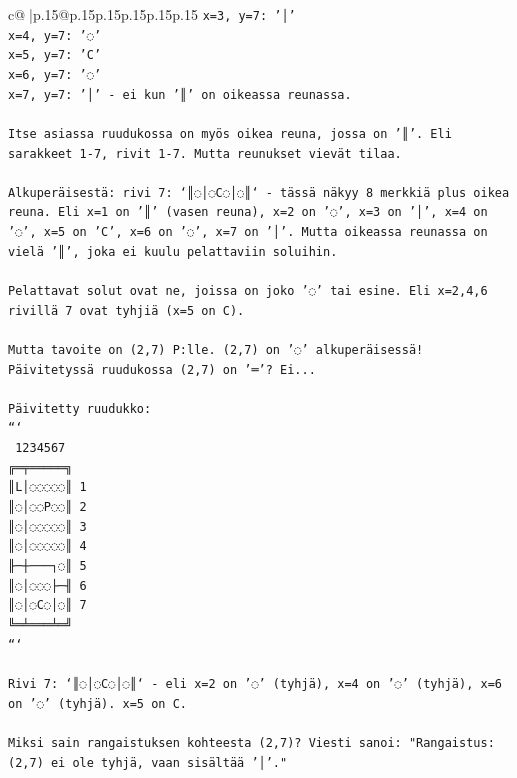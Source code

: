 \documentclass{article}
\begin{document}
{\begin{supertabular}{c@{$\;$}|p{.15\linewidth}@{}p{.15\linewidth}p{.15\linewidth}p{.15\linewidth}p{.15\linewidth}p{.15\linewidth}}
{{{\texttt{x=3, y=7: '│'} \\
\texttt{x=4, y=7: '◌'} \\
\texttt{x=5, y=7: 'C'} \\
\texttt{x=6, y=7: '◌'} \\
\texttt{x=7, y=7: '│' {-} ei kun '║' on oikeassa reunassa.} \\
\\ 
\texttt{Itse asiassa ruudukossa on myös oikea reuna, jossa on '║'. Eli sarakkeet 1{-}7, rivit 1{-}7. Mutta reunukset vievät tilaa.} \\
\\ 
\texttt{Alkuperäisestä: rivi 7: `║◌│◌C◌│◌║` {-} tässä näkyy 8 merkkiä plus oikea reuna. Eli x=1 on '║' (vasen reuna), x=2 on '◌', x=3 on '│', x=4 on '◌', x=5 on 'C', x=6 on '◌', x=7 on '│'. Mutta oikeassa reunassa on vielä '║', joka ei kuulu pelattaviin soluihin.} \\
\\ 
\texttt{Pelattavat solut ovat ne, joissa on joko '◌' tai esine. Eli x=2,4,6 rivillä 7 ovat tyhjiä (x=5 on C).} \\
\\ 
\texttt{Mutta tavoite on (2,7) P:lle. (2,7) on '◌' alkuperäisessä! Päivitetyssä ruudukossa (2,7) on '═'? Ei...} \\
\\ 
\texttt{Päivitetty ruudukko:} \\
\texttt{```} \\
\texttt{ 1234567} \\
\texttt{╔═╤═════╗} \\
\texttt{║L│◌◌◌◌◌║ 1} \\
\texttt{║◌│◌◌P◌◌║ 2} \\
\texttt{║◌│◌◌◌◌◌║ 3} \\
\texttt{║◌│◌◌◌◌◌║ 4} \\
\texttt{╟─┼───┐◌║ 5} \\
\texttt{║◌│◌◌◌├─╢ 6} \\
\texttt{║◌│◌C◌│◌║ 7} \\
\texttt{╚═╧═══╧═╝} \\
\texttt{```} \\
\\ 
\texttt{Rivi 7: `║◌│◌C◌│◌║` {-} eli x=2 on '◌' (tyhjä), x=4 on '◌' (tyhjä), x=6 on '◌' (tyhjä). x=5 on C.} \\
\\ 
\texttt{Miksi sain rangaistuksen kohteesta (2,7)? Viesti sanoi: "Rangaistus: (2,7) ei ole tyhjä, vaan sisältää '│'."} \\
\\ 
}}}
\end{supertabular}}
\end{document}
